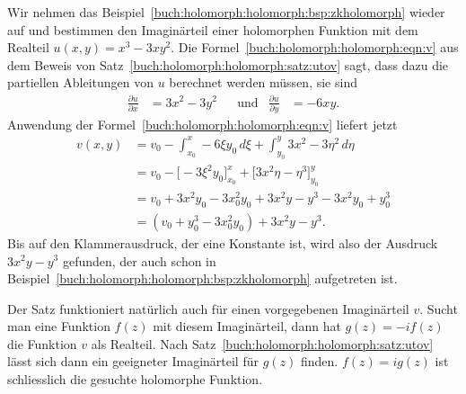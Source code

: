 \begin{beispiel}
Wir nehmen das Beispiel~\ref{buch:holomorph:holomorph:bsp:zkholomorph}
wieder auf und bestimmen den Imaginärteil einer holomorphen Funktion
mit dem Realteil $u(x,y)=x^3-3xy^2$.
Die Formel~\eqref{buch:holomorph:holomorph:eqn:v}
aus dem Beweis von Satz~\ref{buch:holomorph:holomorph:satz:utov}
sagt, dass dazu die partiellen Ableitungen von $u$ berechnet werden
müssen, sie sind
\begin{align*}
\frac{\partial u}{\partial x}
&=
3x^2-3y^2
&&\text{und}&
\frac{\partial u}{\partial y}
&=
-6xy.
\end{align*}
Anwendung der Formel~\eqref{buch:holomorph:holomorph:eqn:v}
liefert jetzt
\begin{align*}
v(x,y)
&=
v_0
-
\int_{x_0}^x -6\xi y_0\,d\xi
+
\int_{y_0}^y 3x^2-3\eta^2
\,d\eta
\\
&=
v_0
-
\biggl[
-3\xi^2y_0
\biggr]_{x_0}^x
+
\biggl[
3x^2\eta-\eta^3
\biggr]_{y_0}^y
\\
&=
v_0
+
3x^2y_0-3x_0^2y_0
+
3x^2y-y^3
-
3x^2y_0 + y_0^3
\\
&=
(v_0
+ y_0^3
-3x_0^2y_0
)
+
3x^2y
-
y^3.
\end{align*}
Bis auf den Klammerausdruck, der eine Konstante ist, wird also der
Ausdruck $3x^2y-y^3$ gefunden, der auch schon in
Beispiel~\ref{buch:holomorph:holomorph:bsp:zkholomorph}
aufgetreten ist.
\end{beispiel}

Der Satz funktioniert natürlich auch für einen vorgegebenen
Imaginärteil $v$.
Sucht man eine Funktion $f(z)$ mit diesem Imaginärteil, dann
hat $g(z)=-if(z)$ die Funktion $v$ als Realteil.
Nach Satz~\ref{buch:holomorph:holomorph:satz:utov} lässt sich
dann ein geeigneter Imaginärteil für $g(z)$ finden.
$f(z)=ig(z)$ ist schliesslich die gesuchte holomorphe Funktion.
